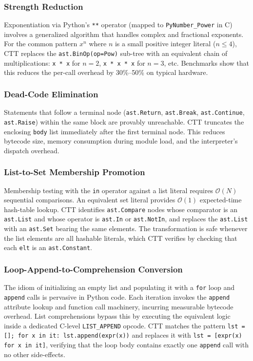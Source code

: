 \documentclass[conference]{IEEEtran}
\begin{document}
\subsubsection{Strength Reduction}
Exponentiation via Python's \texttt{**} operator (mapped to
\texttt{PyNumber\_Power} in C) involves a generalized algorithm that handles
complex and fractional exponents.  For the common pattern $x^n$ where $n$
is a small positive integer literal ($n \leq 4$), CTT replaces the
\texttt{ast.BinOp(op=Pow)} sub-tree with an equivalent chain of multiplications:
\texttt{x * x} for $n = 2$, \texttt{x * x * x} for $n = 3$, etc.  Benchmarks
show that this reduces the per-call overhead by 30\%--50\% on typical hardware.

\subsubsection{Dead-Code Elimination}
Statements that follow a terminal node (\texttt{ast.Return}, \texttt{ast.Break},
\texttt{ast.Continue}, \texttt{ast.Raise}) within the same block are provably
unreachable.  CTT truncates the enclosing \texttt{body} list immediately after
the first terminal node.  This reduces bytecode size, memory consumption during
module load, and the interpreter's dispatch overhead.

\subsubsection{List-to-Set Membership Promotion}
Membership testing with the \texttt{in} operator against a list literal requires
$\mathcal{O}(N)$ sequential comparisons.  An equivalent set literal provides
$\mathcal{O}(1)$ expected-time hash-table lookup.  CTT identifies
\texttt{ast.Compare} nodes whose comparator is an \texttt{ast.List} and whose
operator is \texttt{ast.In} or \texttt{ast.NotIn}, and replaces the
\texttt{ast.List} with an \texttt{ast.Set} bearing the same elements.  The
transformation is safe whenever the list elements are all hashable literals,
which CTT verifies by checking that each \texttt{elt} is an
\texttt{ast.Constant}.

\subsubsection{Loop-Append-to-Comprehension Conversion}
The idiom of initializing an empty list and populating it with a
\texttt{for} loop and \texttt{append} calls is pervasive in Python code.
Each iteration invokes the \texttt{append} attribute lookup and function
call machinery, incurring measurable bytecode overhead.  List comprehensions
bypass this by executing the equivalent logic inside a dedicated C-level
\texttt{LIST\_APPEND} opcode.  CTT matches the pattern
\texttt{lst = []; for x in it: lst.append(expr(x))} and replaces it with
\texttt{lst = [expr(x) for x in it]}, verifying that the loop body contains
exactly one \texttt{append} call with no other side-effects.
\end{document}
